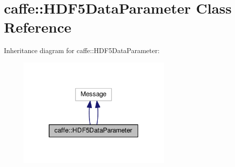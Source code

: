 \hypertarget{classcaffe_1_1_h_d_f5_data_parameter}{}\section{caffe\+:\+:H\+D\+F5\+Data\+Parameter Class Reference}
\label{classcaffe_1_1_h_d_f5_data_parameter}


Inheritance diagram for caffe\+:\+:H\+D\+F5\+Data\+Parameter\+:
\nopagebreak
\begin{figure}[H]
\begin{center}
\leavevmode
\includegraphics[width=217pt]{classcaffe_1_1_h_d_f5_data_parameter__inherit__graph}
\end{center}
\end{figure}
